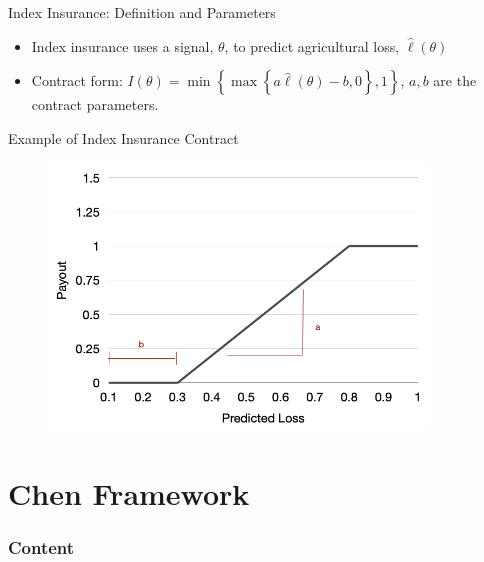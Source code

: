 \documentclass{beamer}
\begin{document}
\begin{frame}{Index Insurance: Definition and Parameters}
\begin{itemize}
    \setlength\itemsep{1em}
    \item Index insurance uses a signal, $\theta$, to predict agricultural loss, $\hat{\ell}(\theta)$
    \item Contract form: $I(\theta) = \min \left \{ \max \left \{a\hat{\ell}(\theta) - b,0 \right \}, 1 \right \}$, $a,b$ are the contract parameters.
\end{itemize}
\end{frame}

\begin{frame}{Example of Index Insurance Contract}
    \begin{figure}
        \includegraphics[width=0.9\textwidth]{../../../output/figures/Presentation/sample_insurance_contract.png}
    \end{figure}
\end{frame}

\section{Chen Framework}
\begin{frame}
    \frametitle{Content}
    \tableofcontents[currentsection]
  \end{frame}
\end{document}

